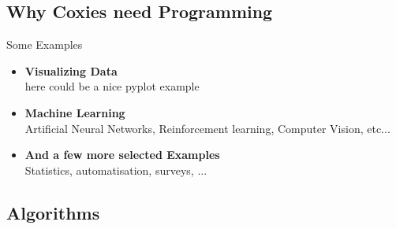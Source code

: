 \subsection{Why Coxies need Programming}

\begin{frame}{Some Examples}

    \begin{itemize}
        \item <2-> \textbf{Visualizing Data} \\
        here could be a nice pyplot example

        \item <3-> \textbf{Machine Learning} \\
        Artificial Neural Networks, Reinforcement learning, Computer Vision, etc...

        \item <4-> \textbf{And a few more selected Examples} \\
        Statistics, automatisation, surveys, ...
    \end{itemize}

    \pause

    \vspace{0.5cm}


    \vspace{0.5cm}


\end{frame}

\subsection{Algorithms}

